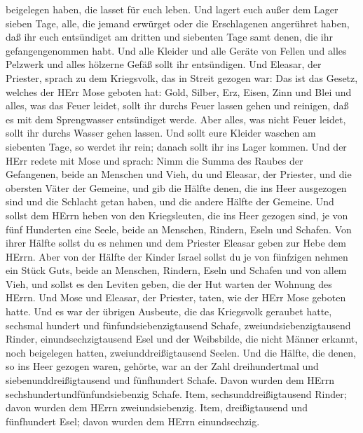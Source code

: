 beigelegen haben, die lasset für euch leben.  Und lagert
euch außer dem Lager sieben Tage, alle, die jemand erwürget oder die
Erschlagenen angerühret haben, daß ihr euch entsündiget am dritten und
siebenten Tage samt denen, die ihr gefangengenommen habt. 
Und alle Kleider und alle Geräte von Fellen und alles Pelzwerk und alles
hölzerne Gefäß sollt ihr entsündigen.  Und Eleasar, der
Priester, sprach zu dem Kriegsvolk, das in Streit gezogen war: Das ist
das Gesetz, welches der HErr Mose geboten hat:  Gold,
Silber, Erz, Eisen, Zinn und Blei  und alles, was das Feuer
leidet, sollt ihr durchs Feuer lassen gehen und reinigen, daß es mit dem
Sprengwasser entsündiget werde. Aber alles, was nicht Feuer leidet,
sollt ihr durchs Wasser gehen lassen.  Und sollt eure
Kleider waschen am siebenten Tage, so werdet ihr rein; danach sollt ihr
ins Lager kommen.  Und der HErr redete mit Mose und sprach:
 Nimm die Summa des Raubes der Gefangenen, beide an
Menschen und Vieh, du und Eleasar, der Priester, und die obersten Väter
der Gemeine,  und gib die Hälfte denen, die ins Heer
ausgezogen sind und die Schlacht getan haben, und die andere Hälfte der
Gemeine.  Und sollst dem HErrn heben von den Kriegsleuten,
die ins Heer gezogen sind, je von fünf Hunderten eine Seele, beide an
Menschen, Rindern, Eseln und Schafen.  Von ihrer Hälfte
sollst du es nehmen und dem Priester Eleasar geben zur Hebe dem HErrn.
 Aber von der Hälfte der Kinder Israel sollst du je von
fünfzigen nehmen ein Stück Guts, beide an Menschen, Rindern, Eseln und
Schafen und von allem Vieh, und sollst es den Leviten geben, die der Hut
warten der Wohnung des HErrn.  Und Mose und Eleasar, der
Priester, taten, wie der HErr Mose geboten hatte.  Und es
war der übrigen Ausbeute, die das Kriegsvolk geraubet hatte, sechsmal
hundert und fünfundsiebenzigtausend Schafe, 
zweiundsiebenzigtausend Rinder,  einundsechzigtausend Esel
 und der Weibsbilde, die nicht Männer erkannt, noch
beigelegen hatten, zweiunddreißigtausend Seelen.  Und die
Hälfte, die denen, so ins Heer gezogen waren, gehörte, war an der Zahl
dreihundertmal und siebenunddreißigtausend und fünfhundert Schafe.
 Davon wurden dem HErrn sechshundertundfünfundsiebenzig
Schafe.  Item, sechsunddreißigtausend Rinder; davon wurden
dem HErrn zweiundsiebenzig.  Item, dreißigtausend und
fünfhundert Esel; davon wurden dem HErrn einundsechzig. 
